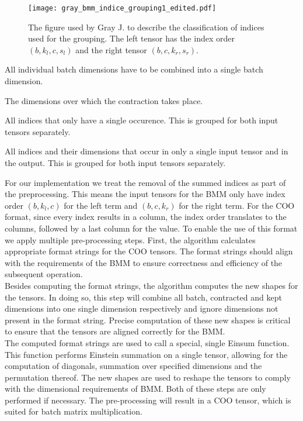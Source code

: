 \begin{figure}[H]
    \centering
    \texttt{[image: gray\_bmm\_indice\_grouping1\_edited.pdf]}
    \caption{The figure used by Gray J. \cite{jcmgray}  to describe the classification of indices
        used for the grouping. The left tensor has the index order $(b, k_l, c, s_l)$ and the right
        tensor $(b, c, k_r, s_r)$.}
    \label{fig:bmm:template}
\end{figure}
%
\begin{description}[leftmargin=!,labelwidth=\widthof{\bfseries Contracted Indices (c)}]
    \item [Batch Indices (b)] All individual batch dimensions have to be combined into a single
          batch dimension.
    \item [Contracted Indices (c)] The dimensions over which the contraction takes place.
    \item [Summed Indices (s)] All indices that only have a single occurence. This is grouped for
          both input tensors separately.
    \item [Kept Indices (k)] All indices and their dimensions that occur in only a single input
          tensor and in the output. This is grouped for both input tensors separately.
\end{description}
%
For our implementation we treat the removal of the summed indices as part of the preprocessing.
This means the input tensors for the BMM only have index order $(b, k_l, c)$ for the left term and
$(b, c, k_r)$ for the right term. For the COO format, since every index results in a column,
the index order translates to the columns, followed by a last column for the value. To enable the use
of this format we apply multiple pre-processing steps. First, the algorithm calculates appropriate
format strings for the COO tensors. The format strings should align with the requirements of the BMM
to ensure correctness and efficiency of the subsequent operation.\\
Besides computing the format strings, the algorithm computes the new shapes for the tensors.
In doing so, this step will combine all batch, contracted and kept dimensions into one single dimension 
respectively and ignore dimensions not present in the format string. Precise computation of these new 
shapes is critical to ensure that the tensors are aligned correctly for the BMM.\\
The computed format strings are used to call a special, single Einsum function. This function performs
Einstein summation on a single tensor, allowing for the computation of diagonals, summation over
specified dimensions and the permutation thereof. The new shapes are used to reshape the tensors to
comply with the dimensional requirements of BMM. Both of these steps are only performed if necessary.
The pre-processing will result in a COO tensor, which is suited for batch matrix multiplication.

